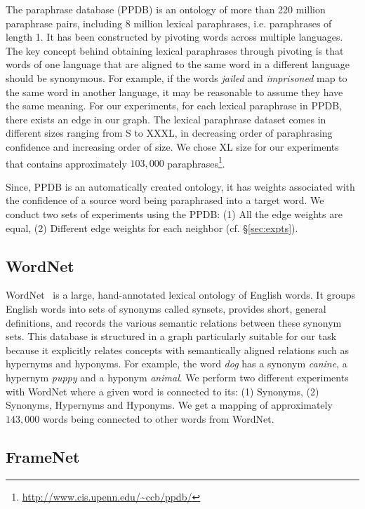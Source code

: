 \documentclass[11pt]{article}
\begin{document}
The paraphrase database (PPDB) \cite{ganitkevitch2013ppdb} is an ontology of more than 220 million paraphrase pairs, including 8 million lexical paraphrases, i.e. paraphrases of length 1. It has been constructed by pivoting words across multiple languages. The key concept behind obtaining lexical paraphrases through pivoting is that words of one language that are aligned to the same word in a different language should be synonymous. For example, if the words \textit{jailed} and \textit{imprisoned} map to the same word in another language, it may be reasonable to assume they have the same meaning. For our experiments, for each lexical paraphrase in PPDB, there exists an edge in our graph. The lexical paraphrase dataset comes in different sizes ranging from S to XXXL, in decreasing order of paraphrasing confidence and increasing order of size. We chose XL size for our experiments that contains approximately $103,000$ paraphrases\footnote{\url{http://www.cis.upenn.edu/~ccb/ppdb/}}.

Since, PPDB is an automatically created ontology, it has weights associated 
with the confidence
of a source word being paraphrased into a target word. We conduct two sets of 
experiments using the 
PPDB: (1) All the edge weights are equal, (2) Different edge weights for each neighbor (cf. \S\ref{sec:expts}). 

\subsection{WordNet} 
\label{sec:wordnet}

WordNet~\cite{miller:1995} is a large, hand-annotated lexical ontology of English words. 
It groups English words into sets of synonyms called synsets, provides short, general definitions, and records the various semantic relations between these synonym sets.
This database is structured in a graph particularly suitable for our task because it explicitly relates concepts with semantically aligned relations such as hypernyms and hyponyms. For example, the word \textit{dog} has a synonym \textit{canine}, a hypernym \textit{puppy} and a hyponym \textit{animal}. We perform two different experiments with WordNet where a given word is connected to
its: (1) Synonyms, (2) Synonyms, Hypernyms and Hyponyms. 
We get a mapping of approximately $143,000$ words being connected to other words from WordNet.

\subsection{FrameNet}
\label{sec:framenet}
\end{document}
